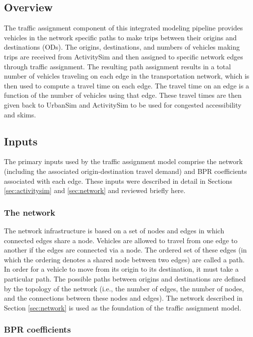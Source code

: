 \subsection{Overview}

The traffic assignment component of this integrated modeling pipeline provides vehicles in the network specific paths to make trips between their origins and destinations (ODs). The origins, destinations, and numbers of vehicles making trips are received from ActivitySim and then assigned to specific network edges through traffic assignment. The resulting path assignment results in a total number of vehicles traveling on each edge in the transportation network, which is then used to compute a travel time on each edge. The travel time on an edge is a function of the number of vehicles using that edge. These travel times are then given back to UrbanSim and ActivitySim to be used for congested accessibility and skims.


\subsection{Inputs}

The primary inputs used by the traffic assignment model comprise the network (including the associated origin-destination travel demand) and BPR coefficients associated with each edge. These inputs were described in detail in Sections \ref{sec:activitysim} and \ref{sec:network} and reviewed briefly here.


\subsubsection{The network}

The network infrastructure is based on a set of nodes and edges in which connected edges share a node. Vehicles are allowed to travel from one edge to another if the edges are connected via a node. The ordered set of these edges (in which the ordering denotes a shared node between two edges) are called a path. In order for a vehicle to move from its origin to its destination, it must take a particular path. The possible paths between origins and destinations are defined by the topology of the network (i.e., the number of edges, the number of nodes, and the connections between these nodes and edges). The network described in Section \ref{sec:network} is used as the foundation of the traffic assignment model. 


\subsubsection{BPR coefficients}

